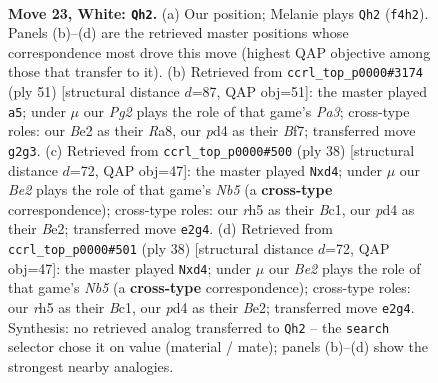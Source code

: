 \documentclass[11pt]{article}
\begin{document}
\clearpage

\begin{figure}[p]\centering
\begin{subfigure}{0.46\textwidth}\centering
\resizebox{\linewidth}{!}{%
\newchessgame
\chessboard[
  setfen={r2k2n1/1b2q3/7b/p1p1Pp1r/3p1Q1p/NP5P/P3B1P1/R1B3KR w - - 3 23},
  showmover=false,
  pgfstyle=straightmove, color=movearrow, markmove={f4-h2}
]}
\caption{}
\end{subfigure}\hfill
\begin{subfigure}{0.46\textwidth}\centering
\resizebox{\linewidth}{!}{%
\newchessgame
\chessboard[
  setfen={r3r2k/5bpp/pq3b2/3p1PB1/2pP4/2P4P/1P1QN1R1/R5K1 b - - 1 26},
  showmover=false,
  pgfstyle=straightmove, color=movearrow, markmove={a6-a5}
]}
\caption{}
\end{subfigure}
\\[4pt]
\begin{subfigure}{0.46\textwidth}\centering
\resizebox{\linewidth}{!}{%
\newchessgame
\chessboard[
  setfen={r1bqk2r/5pQ1/1pn1p3/1N4Pp/3bP3/7P/PP2B3/R1B1K2R w KQkq - 1 20},
  showmover=false,
  pgfstyle=straightmove, color=movearrow, markmove={b5-d4}
]}
\caption{}
\end{subfigure}\hfill
\begin{subfigure}{0.46\textwidth}\centering
\resizebox{\linewidth}{!}{%
\newchessgame
\chessboard[
  setfen={r1bqk2r/5pQ1/1pn1p3/1N4Pp/3bP3/7P/PP2B3/R1B1K2R w KQkq - 1 20},
  showmover=false,
  pgfstyle=straightmove, color=movearrow, markmove={b5-d4}
]}
\caption{}
\end{subfigure}
\caption{\textbf{Move 23, White: \texttt{Qh2}.} (a) Our position; Melanie plays \texttt{Qh2} (\texttt{f4h2}). Panels (b)--(d) are the retrieved master positions whose correspondence most drove this move (highest QAP objective among those that transfer to it). (b) Retrieved from \texttt{ccrl\_top\_p0000\#3174} (ply 51) [structural distance $d$=87, QAP obj=51]: the master played \texttt{a5}; under $\mu$ our \emph{Pg2} plays the role of that game's \emph{Pa3}; cross-type roles: our \emph{B}e2 as their \emph{R}a8, our \emph{p}d4 as their \emph{B}f7; transferred move \texttt{g2g3}. (c) Retrieved from \texttt{ccrl\_top\_p0000\#500} (ply 38) [structural distance $d$=72, QAP obj=47]: the master played \texttt{Nxd4}; under $\mu$ our \emph{Be2} plays the role of that game's \emph{Nb5} (a \textbf{cross-type} correspondence); cross-type roles: our \emph{r}h5 as their \emph{B}c1, our \emph{p}d4 as their \emph{B}e2; transferred move \texttt{e2g4}. (d) Retrieved from \texttt{ccrl\_top\_p0000\#501} (ply 38) [structural distance $d$=72, QAP obj=47]: the master played \texttt{Nxd4}; under $\mu$ our \emph{Be2} plays the role of that game's \emph{Nb5} (a \textbf{cross-type} correspondence); cross-type roles: our \emph{r}h5 as their \emph{B}c1, our \emph{p}d4 as their \emph{B}e2; transferred move \texttt{e2g4}. Synthesis: no retrieved analog transferred to \texttt{Qh2} -- the \texttt{search} selector chose it on value (material / mate); panels (b)--(d) show the strongest nearby analogies.}
\label{fig:thought-m44}
\end{figure}
\end{document}
